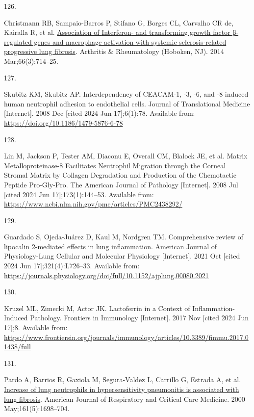 \documentclass[
]{article}
\newlength{\cslhangindent}
\newlength{\csllabelwidth}
\newenvironment{CSLReferences}[2] %
 {\begin{list}{}{%
  \setlength{\itemindent}{0pt}
  \setlength{\leftmargin}{0pt}
  \setlength{\parsep}{0pt}
  \ifodd #1
   \setlength{\leftmargin}{\cslhangindent}
   \setlength{\itemindent}{-1\cslhangindent}
  \fi
  \setlength{\itemsep}{#2\baselineskip}}}
 {\end{list}}
\newcommand{\CSLLeftMargin}[1]{\parbox[t]{\csllabelwidth}{\strut#1\strut}}
\newcommand{\CSLRightInline}[1]{\parbox[t]{\linewidth - \csllabelwidth}{\strut#1\strut}}
\begin{document}
\begin{CSLReferences}{0}{1}
\CSLLeftMargin{126. }%
\CSLRightInline{Christmann RB, Sampaio-Barros P, Stifano G, Borges CL, Carvalho CR de, Kairalla R, et al. \href{https://doi.org/10.1002/art.38288}{Association of {Interferon}- and transforming growth factor β-regulated genes and macrophage activation with systemic sclerosis-related progressive lung fibrosis}. Arthritis \& Rheumatology (Hoboken, NJ). 2014 Mar;66(3):714--25. }

\CSLLeftMargin{127. }%
\CSLRightInline{Skubitz KM, Skubitz AP. Interdependency of {CEACAM}-1, -3, -6, and -8 induced human neutrophil adhesion to endothelial cells. Journal of Translational Medicine {[}Internet{]}. 2008 Dec {[}cited 2024 Jun 17{]};6(1):78. Available from: \url{https://doi.org/10.1186/1479-5876-6-78}}

\CSLLeftMargin{128. }%
\CSLRightInline{Lin M, Jackson P, Tester AM, Diaconu E, Overall CM, Blalock JE, et al. Matrix {Metalloproteinase}-8 {Facilitates} {Neutrophil} {Migration} through the {Corneal} {Stromal} {Matrix} by {Collagen} {Degradation} and {Production} of the {Chemotactic} {Peptide} {Pro}-{Gly}-{Pro}. The American Journal of Pathology {[}Internet{]}. 2008 Jul {[}cited 2024 Jun 17{]};173(1):144--53. Available from: \url{https://www.ncbi.nlm.nih.gov/pmc/articles/PMC2438292/}}

\CSLLeftMargin{129. }%
\CSLRightInline{Guardado S, Ojeda-Juárez D, Kaul M, Nordgren TM. Comprehensive review of lipocalin 2-mediated effects in lung inflammation. American Journal of Physiology-Lung Cellular and Molecular Physiology {[}Internet{]}. 2021 Oct {[}cited 2024 Jun 17{]};321(4):L726--33. Available from: \url{https://journals.physiology.org/doi/full/10.1152/ajplung.00080.2021}}

\CSLLeftMargin{130. }%
\CSLRightInline{Kruzel ML, Zimecki M, Actor JK. Lactoferrin in a {Context} of {Inflammation}-{Induced} {Pathology}. Frontiers in Immunology {[}Internet{]}. 2017 Nov {[}cited 2024 Jun 17{]};8. Available from: \url{https://www.frontiersin.org/journals/immunology/articles/10.3389/fimmu.2017.01438/full}}

\CSLLeftMargin{131. }%
\CSLRightInline{Pardo A, Barrios R, Gaxiola M, Segura-Valdez L, Carrillo G, Estrada A, et al. \href{https://doi.org/10.1164/ajrccm.161.5.9907065}{Increase of lung neutrophils in hypersensitivity pneumonitis is associated with lung fibrosis}. American Journal of Respiratory and Critical Care Medicine. 2000 May;161(5):1698--704. }


\end{CSLReferences}
\end{document}
